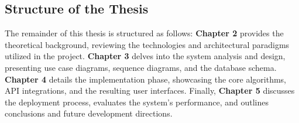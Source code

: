 \subsection{Structure of the Thesis}
The remainder of this thesis is structured as follows:
\textbf{Chapter 2} provides the theoretical background, reviewing the technologies and architectural paradigms utilized in the project. 
\textbf{Chapter 3} delves into the system analysis and design, presenting use case diagrams, sequence diagrams, and the database schema. 
\textbf{Chapter 4} details the implementation phase, showcasing the core algorithms, API integrations, and the resulting user interfaces. 
Finally, \textbf{Chapter 5} discusses the deployment process, evaluates the system's performance, and outlines conclusions and future development directions.
